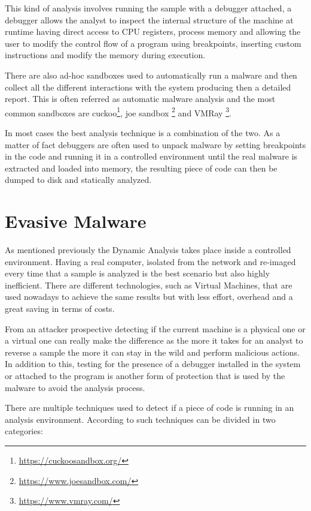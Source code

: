 This kind of analysis involves running the sample with a debugger attached, a debugger allows the analyst to inspect the internal structure of the machine at runtime having direct access to CPU registers, process memory and allowing the user to modify the control flow of a program using breakpoints, inserting custom instructions and modify the memory during execution. 

There are also ad-hoc sandboxes used to automatically run a malware and then collect all the different interactions with the system producing then a detailed report. This is often referred as automatic malware analysis and the most common sandboxes are cuckoo\footnote{\url{https://cuckoosandbox.org/}}, joe sandbox \footnote{\url{https://www.joesandbox.com/}} and VMRay \footnote{\url{https://www.vmray.com/}}. 

In most cases the best analysis technique is a combination of the two. As a matter of fact debuggers are often used to unpack malware by setting breakpoints in the code and running it in a controlled environment until the real malware is extracted and loaded into memory, the resulting piece of code can then be dumped to disk and statically analyzed. 

\section{Evasive Malware}

As mentioned previously the Dynamic Analysis takes place inside a controlled environment. Having a real computer, isolated from the network and re-imaged every time that a sample is analyzed is the best scenario but also highly inefficient. There are different technologies, such as Virtual Machines, that are used nowadays to achieve the same results but with less effort, overhead and a great saving in terms of costs. 

From an attacker prospective detecting if the current machine is a physical one or a virtual one can really make the difference as the more it takes for an analyst to reverse a sample the more it can stay in the wild and perform malicious actions. In addition to this, testing for the presence of a debugger installed in the system or attached to the program is another form of protection that is used by the malware to avoid the analysis process.

There are multiple techniques used to detect if a piece of code is running in an analysis environment. According to \cite{9018111} such techniques can be divided in two categories:

